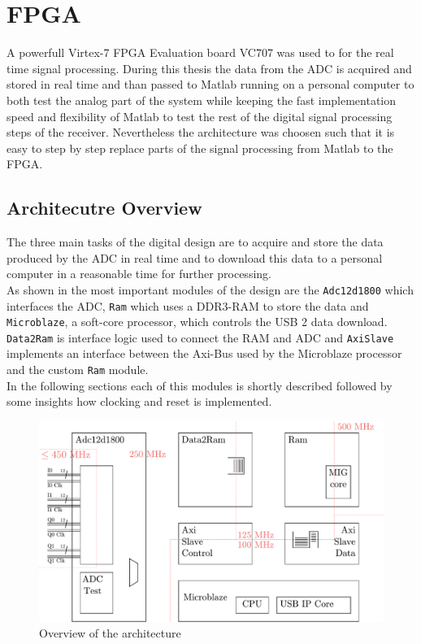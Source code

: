 \chapter{FPGA}
\label{chap:fpga}
A powerfull Virtex-7 \gls{FPGA} Evaluation board VC707
was used to for the real time signal processing.
During this thesis the data from the \gls{ADC} is acquired and stored in real
time and than passed to Matlab running on a personal computer to both test
the analog part of the system while keeping the fast implementation speed
and flexibility of Matlab to test the rest of the digital signal processing steps
of the receiver. Nevertheless the architecture was choosen such that it is easy
to step by step replace parts of the signal processing from Matlab to the
\gls{FPGA}.

\section{Architecutre Overview}
The three main tasks of the digital design are to acquire and store the data
produced by the \gls{ADC} in real time and to download this data to a
personal computer in a reasonable time for further processing. \\

As shown in  the most important
modules of the design are the \verb|Adc12d1800| which interfaces the
\gls{ADC}, \verb|Ram| which uses a DDR3-\gls{RAM} to store the data
and \verb|Microblaze|, a soft-core processor, which controls the
\gls{USB} 2 data download. \verb|Data2Ram| is interface logic used
to connect the \gls{RAM} and \gls{ADC} and \verb|AxiSlave| implements
an interface between the Axi-Bus used by the Microblaze processor
and the custom \verb|Ram| module. \\

In the following sections each of this modules is shortly described followed
by some insights how clocking and reset is implemented.

\begin{figure}[ht]
  \centering
  \includegraphics[width=\textwidth]{figures/fpga_architecture_overview}
  \caption{Overview of the architecture}
  \label{fig:fpga_architecture_overview}
\end{figure}

